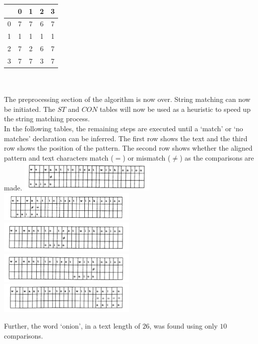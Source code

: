 \begin{tabular}{ | c | c c c c | }\hline
    & 0 & 1 & 2 & 3  \\\hline
  0 & 7 & 7 & 6 & 7  \\
  1 & 1 & 1 & 1 & 1  \\
  2 & 7 & 2 & 6 & 7  \\
  3 & 7 & 7 & 3 & 7  \\\hline
\end{tabular}\\
 \\
The preprocessing section of the algorithm is now over. String matching can now be initiated. The $ST$ and $CON$ tables will now be used as a heuristic to speed up the string matching process.\\
In the following tables, the remaining steps are executed until a `match' or `no matches' declaration can be inferred. The first row shows the text and the third row shows the position of the pattern. The second row shows whether the aligned pattern and text characters match ($=$) or mismatch ($\neq$) as the comparisons are made.
\includegraphics[width=0.5\textwidth]{img/br-1.png}
\includegraphics[width=0.5\textwidth]{img/br-2.png}
\includegraphics[width=0.5\textwidth]{img/br-3.png}
\includegraphics[width=0.5\textwidth]{img/br-4.png}
\includegraphics[width=0.5\textwidth]{img/br-5.png}

Further, the word `onion', in a text length of $26$, was found using only $10$ comparisons.